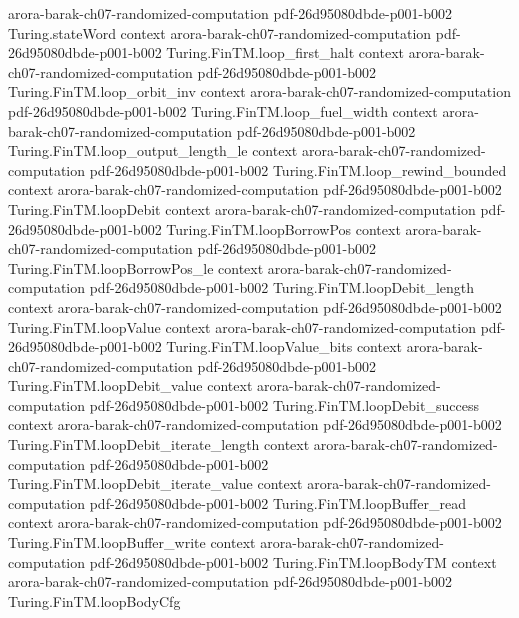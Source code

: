 \begin{theorem}
  {arora-barak-ch07-randomized-computation}
  {pdf-26d95080dbde-p001-b002}
\proofstep
  {Turing.stateWord}
  {context}
  {arora-barak-ch07-randomized-computation}
  {pdf-26d95080dbde-p001-b002}
\proofstep
  {Turing.FinTM.loop_first_halt}
  {context}
  {arora-barak-ch07-randomized-computation}
  {pdf-26d95080dbde-p001-b002}
\proofstep
  {Turing.FinTM.loop_orbit_inv}
  {context}
  {arora-barak-ch07-randomized-computation}
  {pdf-26d95080dbde-p001-b002}
\proofstep
  {Turing.FinTM.loop_fuel_width}
  {context}
  {arora-barak-ch07-randomized-computation}
  {pdf-26d95080dbde-p001-b002}
\proofstep
  {Turing.FinTM.loop_output_length_le}
  {context}
  {arora-barak-ch07-randomized-computation}
  {pdf-26d95080dbde-p001-b002}
\proofstep
  {Turing.FinTM.loop_rewind_bounded}
  {context}
  {arora-barak-ch07-randomized-computation}
  {pdf-26d95080dbde-p001-b002}
\proofstep
  {Turing.FinTM.loopDebit}
  {context}
  {arora-barak-ch07-randomized-computation}
  {pdf-26d95080dbde-p001-b002}
\proofstep
  {Turing.FinTM.loopBorrowPos}
  {context}
  {arora-barak-ch07-randomized-computation}
  {pdf-26d95080dbde-p001-b002}
\proofstep
  {Turing.FinTM.loopBorrowPos_le}
  {context}
  {arora-barak-ch07-randomized-computation}
  {pdf-26d95080dbde-p001-b002}
\proofstep
  {Turing.FinTM.loopDebit_length}
  {context}
  {arora-barak-ch07-randomized-computation}
  {pdf-26d95080dbde-p001-b002}
\proofstep
  {Turing.FinTM.loopValue}
  {context}
  {arora-barak-ch07-randomized-computation}
  {pdf-26d95080dbde-p001-b002}
\proofstep
  {Turing.FinTM.loopValue_bits}
  {context}
  {arora-barak-ch07-randomized-computation}
  {pdf-26d95080dbde-p001-b002}
\proofstep
  {Turing.FinTM.loopDebit_value}
  {context}
  {arora-barak-ch07-randomized-computation}
  {pdf-26d95080dbde-p001-b002}
\proofstep
  {Turing.FinTM.loopDebit_success}
  {context}
  {arora-barak-ch07-randomized-computation}
  {pdf-26d95080dbde-p001-b002}
\proofstep
  {Turing.FinTM.loopDebit_iterate_length}
  {context}
  {arora-barak-ch07-randomized-computation}
  {pdf-26d95080dbde-p001-b002}
\proofstep
  {Turing.FinTM.loopDebit_iterate_value}
  {context}
  {arora-barak-ch07-randomized-computation}
  {pdf-26d95080dbde-p001-b002}
\proofstep
  {Turing.FinTM.loopBuffer_read}
  {context}
  {arora-barak-ch07-randomized-computation}
  {pdf-26d95080dbde-p001-b002}
\proofstep
  {Turing.FinTM.loopBuffer_write}
  {context}
  {arora-barak-ch07-randomized-computation}
  {pdf-26d95080dbde-p001-b002}
\proofstep
  {Turing.FinTM.loopBodyTM}
  {context}
  {arora-barak-ch07-randomized-computation}
  {pdf-26d95080dbde-p001-b002}
\proofstep
  {Turing.FinTM.loopBodyCfg}

\end{theorem}
